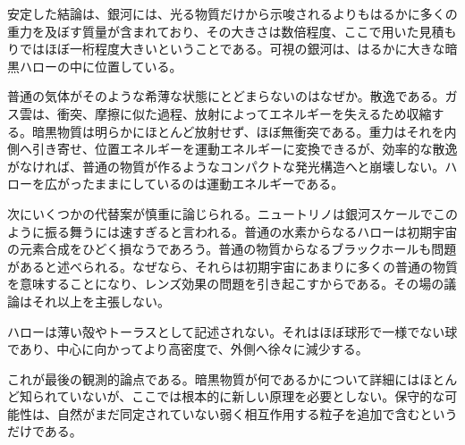 \begin{classroomqa}
\end{classroomqa}

安定した結論は、銀河には、光る物質だけから示唆されるよりもはるかに多くの重力を及ぼす質量が含まれており、その大きさは数倍程度、ここで用いた見積もりではほぼ一桁程度大きいということである。可視の銀河は、はるかに大きな暗黒ハローの中に位置している。

普通の気体がそのような希薄な状態にとどまらないのはなぜか。散逸である。ガス雲は、衝突、摩擦に似た過程、放射によってエネルギーを失えるため収縮する。暗黒物質は明らかにほとんど放射せず、ほぼ無衝突である。重力はそれを内側へ引き寄せ、位置エネルギーを運動エネルギーに変換できるが、効率的な散逸がなければ、普通の物質が作るようなコンパクトな発光構造へと崩壊しない。ハローを広がったままにしているのは運動エネルギーである。

次にいくつかの代替案が慎重に論じられる。ニュートリノは銀河スケールでこのように振る舞うには速すぎると言われる。普通の水素からなるハローは初期宇宙の元素合成をひどく損なうであろう。普通の物質からなるブラックホールも問題があると述べられる。なぜなら、それらは初期宇宙にあまりに多くの普通の物質を意味することになり、レンズ効果の問題を引き起こすからである。その場の議論はそれ以上を主張しない。

ハローは薄い殻やトーラスとして記述されない。それはほぼ球形で一様でない球であり、中心に向かってより高密度で、外側へ徐々に減少する。

\begin{classroomqa}
\end{classroomqa}

これが最後の観測的論点である。暗黒物質が何であるかについて詳細にはほとんど知られていないが、ここでは根本的に新しい原理を必要としない。保守的な可能性は、自然がまだ同定されていない弱く相互作用する粒子を追加で含むというだけである。
